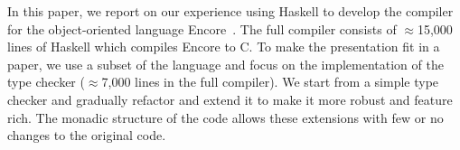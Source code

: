 \documentclass[sigplan,screen]{acmart}
\newcommand{\RED}[1]{\textcolor{red}{#1}}
\newcommand{\ELIAS}[1]{\textcolor{orange}{[Elias: #1]}}
\newcommand{\uncover}[2]{#2}
\begin{document}
In this paper, we report on our experience using Haskell to
develop the compiler for
\uncover{a concurrent, object-oriented language.}
              {the object-oriented language Encore~\cite{DBLP:conf/sfm/BrandauerCCFJPT15}.}
The full compiler consists of
$\approx$15,000 lines of Haskell which compiles Encore to C.
%
To make the presentation fit in a paper, we use a subset of the
language and focus on the implementation of the type checker
($\approx$7,000 lines in the full compiler).
We start from a simple type
checker and gradually refactor and extend it to make it more
robust and feature rich. The monadic structure of the code
allows these extensions with
few or no changes to the original code.
%
\end{document}
